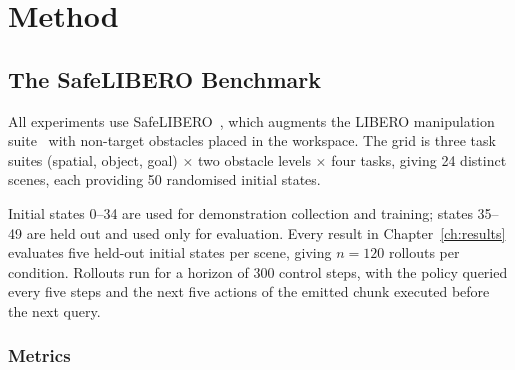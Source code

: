 %
%
%

\chapter{Method}\label{ch:method}

\section{The SafeLIBERO Benchmark}\label{sec:benchmark}

All experiments use SafeLIBERO~\cite{vlsa2026}, which augments the LIBERO manipulation
suite~\cite{liu2023libero} with non-target obstacles placed in the workspace. The grid is three
task suites (spatial, object, goal) $\times$ two obstacle levels $\times$ four tasks, giving 24
distinct scenes, each providing 50 randomised initial states.

Initial states 0--34 are used for demonstration collection and training; states 35--49 are held out
and used only for evaluation. Every result in Chapter~\ref{ch:results} evaluates five held-out
initial states per scene, giving $n = 120$ rollouts per condition. Rollouts run for a horizon of
300 control steps, with the policy queried every five steps and the next five actions of the
emitted chunk executed before the next query.

\subsection{Metrics}\label{sec:metrics}

